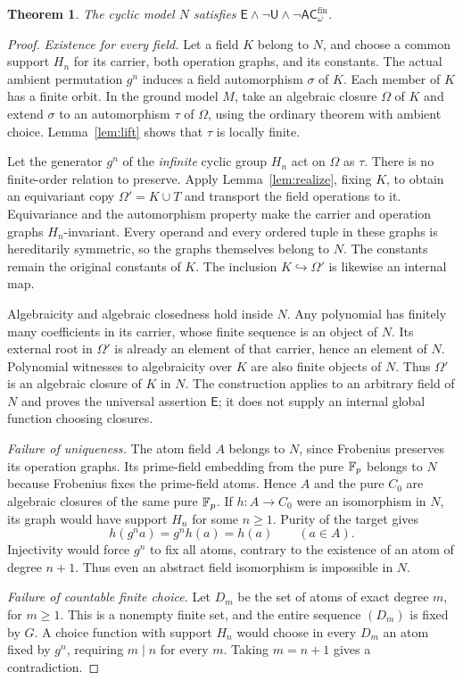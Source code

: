 \documentclass[11pt,a4paper]{article}
\newtheorem{theorem}{Theorem}[section]
\theoremstyle{definition}\newtheorem{definition}[theorem]{Definition}
\theoremstyle{remark}\newtheorem{remark}[theorem]{Remark}
\newcommand{\E}{\mathsf E}\newcommand{\U}{\mathsf U}
\newcommand{\ACwfin}{\mathsf{AC}^{\mathrm{fin}}_{\omega}}
\begin{document}
\begin{theorem}\label{thm:cyclic}
The cyclic model $N$ satisfies $\E\wedge\neg\U\wedge\neg\ACwfin$.
\end{theorem}
\begin{proof}
\emph{Existence for every field.} Let a field $K$ belong to $N$, and choose a common support $H_n$ for its carrier, both operation graphs, and its constants. The actual ambient permutation $g^n$ induces a field automorphism $\sigma$ of $K$. Each member of $K$ has a finite orbit. In the ground model $M$, take an algebraic closure $\Omega$ of $K$ and extend $\sigma$ to an automorphism $\tau$ of $\Omega$, using the ordinary theorem with ambient choice. Lemma~\ref{lem:lift} shows that $\tau$ is locally finite.

Let the generator $g^n$ of the \emph{infinite} cyclic group $H_n$ act on $\Omega$ as $\tau$. There is no finite-order relation to preserve. Apply Lemma~\ref{lem:realize}, fixing $K$, to obtain an equivariant copy $\Omega'=K\cup T$ and transport the field operations to it. Equivariance and the automorphism property make the carrier and operation graphs $H_n$-invariant. Every operand and every ordered tuple in these graphs is hereditarily symmetric, so the graphs themselves belong to $N$. The constants remain the original constants of $K$. The inclusion $K\hookrightarrow\Omega'$ is likewise an internal map.

Algebraicity and algebraic closedness hold inside $N$. Any polynomial has finitely many coefficients in its carrier, whose finite sequence is an object of $N$. Its external root in $\Omega'$ is already an element of that carrier, hence an element of $N$. Polynomial witnesses to algebraicity over $K$ are also finite objects of $N$. Thus $\Omega'$ is an algebraic closure of $K$ in $N$. The construction applies to an arbitrary field of $N$ and proves the universal assertion $\E$; it does not supply an internal global function choosing closures.

\emph{Failure of uniqueness.} The atom field $A$ belongs to $N$, since Frobenius preserves its operation graphs. Its prime-field embedding from the pure $\mathbb F_p$ belongs to $N$ because Frobenius fixes the prime-field atoms. Hence $A$ and the pure $C_0$ are algebraic closures of the same pure $\mathbb F_p$. If $h:A\to C_0$ were an isomorphism in $N$, its graph would have support $H_n$ for some $n\geq1$. Purity of the target gives
\[
h(g^n a)=g^n h(a)=h(a)\qquad(a\in A).
\]
Injectivity would force $g^n$ to fix all atoms, contrary to the existence of an atom of degree $n+1$. Thus even an abstract field isomorphism is impossible in $N$.

\emph{Failure of countable finite choice.} Let $D_m$ be the set of atoms of exact degree $m$, for $m\geq1$. This is a nonempty finite set, and the entire sequence $(D_m)$ is fixed by $G$. A choice function with support $H_n$ would choose in every $D_m$ an atom fixed by $g^n$, requiring $m\mid n$ for every $m$. Taking $m=n+1$ gives a contradiction.
\end{proof}
\end{document}
